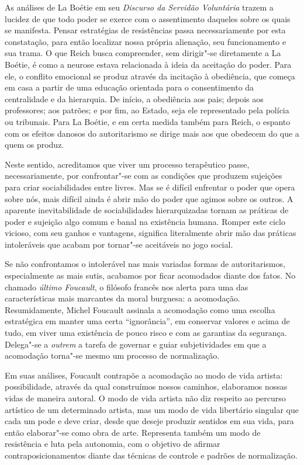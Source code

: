 As análises de La Boétie em seu \emph{Discurso da Servidão Voluntária}
trazem a lucidez de que todo poder se exerce com o assentimento daqueles
sobre os quais se manifesta. Pensar estratégias de resistências passa
necessariamente por esta constatação, para então localizar nossa própria
alienação, seu funcionamento e sua trama. O que Reich busca compreender,
sem dirigir"-se diretamente a La Boétie, é como a neurose estava
relacionada à ideia da aceitação do poder. Para ele, o conflito
emocional se produz através da incitação à obediência, que começa em
casa a partir de uma educação orientada para o consentimento da
centralidade e da hierarquia. De início, a obediência aos pais; depois
aos professores; aos patrões; e por fim, ao Estado, seja ele
representado pela polícia ou tribunais. Para La Boétie, e em certa
medida também para Reich, o espanto com os efeitos danosos do
autoritarismo se dirige mais aos que obedecem do que a quem os produz.

Neste sentido, acreditamos que viver um processo terapêutico passe,
necessariamente, por confrontar"-se com as condições que produzem
sujeições para criar sociabilidades entre livres. Mas se é difícil
enfrentar o poder que opera sobre nós, mais difícil ainda é abrir mão do
poder que agimos sobre os outros. A aparente inevitabilidade de
sociabilidades hierarquizadas tornam as práticas de poder e sujeição
algo comum e banal na existência humana. Romper este ciclo vicioso, com
seu ganhos e vantagens, significa literalmente abrir mão das práticas
intoleráveis que acabam por tornar"-se aceitáveis no jogo social.

Se não confrontamos o intolerável nas mais variadas formas de
autoritarismos, especialmente as mais sutis, acabamos por ficar
acomodados diante dos fatos. No chamado \emph{último Foucault}, o %
filósofo francês nos alerta para uma das características mais marcantes
da moral burguesa: a acomodação. Resumidamente, Michel Foucault assinala
a acomodação como uma escolha estratégica em manter uma certa
``ignorância'', em conservar valores e acima de tudo, em viver uma
existência de pouco risco e com as garantias da segurança. Delega"-se a
\emph{outrem} a tarefa de governar e guiar subjetividades em que a
acomodação torna"-se mesmo um processo de normalização.

Em suas análises, Foucault contrapõe a acomodação ao modo de vida
artista: possibilidade, através da qual construímos nossos caminhos,
elaboramos nossas vidas de maneira autoral. O modo de vida artista não
diz respeito ao percurso artístico de um determinado artista, mas um
modo de vida libertário singular que cada um pode e deve criar, desde
que deseje produzir sentidos em sua vida, para então elaborar"-se como
obra de arte. Representa também um modo de resistência e luta pela
autonomia, com o objetivo de afirmar contraposicionamentos diante das
técnicas de controle e padrões de normalização.

